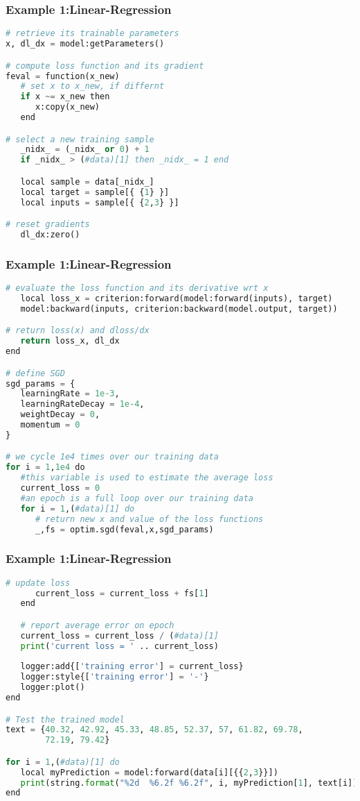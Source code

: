 \begin{frame}[fragile]
\MyLogo
\frametitle{Example 1:Linear-Regression}  
\scriptsize{
\begin{lstlisting}[language=python]
# retrieve its trainable parameters
x, dl_dx = model:getParameters()

# compute loss function and its gradient 
feval = function(x_new)
   # set x to x_new, if differnt
   if x ~= x_new then
      x:copy(x_new)
   end

# select a new training sample
   _nidx_ = (_nidx_ or 0) + 1
   if _nidx_ > (#data)[1] then _nidx_ = 1 end

   local sample = data[_nidx_]
   local target = sample[{ {1} }]    
   local inputs = sample[{ {2,3} }] 

# reset gradients
   dl_dx:zero()
\end{lstlisting}
}
\end{frame}

\begin{frame}[fragile]
\MyLogo
\frametitle{Example 1:Linear-Regression}  
\scriptsize{
\begin{lstlisting}[language=python]
# evaluate the loss function and its derivative wrt x
   local loss_x = criterion:forward(model:forward(inputs), target)
   model:backward(inputs, criterion:backward(model.output, target))

# return loss(x) and dloss/dx
   return loss_x, dl_dx
end

# define SGD 
sgd_params = {
   learningRate = 1e-3,
   learningRateDecay = 1e-4,
   weightDecay = 0,
   momentum = 0
}

# we cycle 1e4 times over our training data
for i = 1,1e4 do
   #this variable is used to estimate the average loss
   current_loss = 0
   #an epoch is a full loop over our training data
   for i = 1,(#data)[1] do
      # return new x and value of the loss functions
      _,fs = optim.sgd(feval,x,sgd_params)
\end{lstlisting}
}
\end{frame}

\begin{frame}[fragile]
\MyLogo
\frametitle{Example 1:Linear-Regression}  
\scriptsize{
\begin{lstlisting}[language=python]
      # update loss       
      current_loss = current_loss + fs[1]
   end

   # report average error on epoch
   current_loss = current_loss / (#data)[1]
   print('current loss = ' .. current_loss)
   
   logger:add{['training error'] = current_loss}
   logger:style{['training error'] = '-'}
   logger:plot()  
end

# Test the trained model
text = {40.32, 42.92, 45.33, 48.85, 52.37, 57, 61.82, 69.78, 
        72.19, 79.42}

for i = 1,(#data)[1] do
   local myPrediction = model:forward(data[i][{{2,3}}])
   print(string.format("%2d  %6.2f %6.2f", i, myPrediction[1], text[i]))
end
\end{lstlisting}
}
\end{frame}